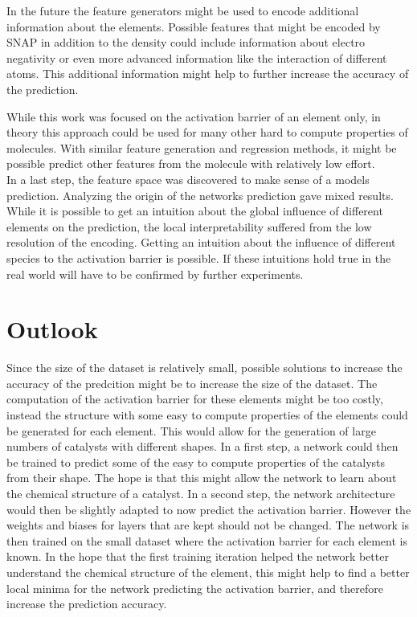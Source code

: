 In the future the feature generators might be used to encode additional information about the elements.
Possible features that might be encoded by SNAP in addition to the density could include information about 
electro negativity or even more advanced information like the interaction of different atoms.
This additional information might help to further increase the accuracy of the prediction.

While this work was focused on the activation barrier of an element only,
in theory this approach could be used for many other hard to compute properties of molecules.
With similar feature generation and regression methods, it might be possible 
predict other features from the molecule with relatively low effort.
\\

In a last step, the feature space was discovered to make sense of a models prediction.
Analyzing the origin of the networks prediction gave mixed results.
While it is possible to get an intuition about the global influence of different elements on
the prediction, the local interpretability suffered from the low resolution of the encoding.
Getting an intuition about the influence of different species to the activation barrier is possible.
If these intuitions hold true in the real world will have to be confirmed by further experiments.

\section{Outlook}

Since the size of the dataset is relatively small, possible solutions to increase the accuracy of the predcition might be to 
increase the size of the dataset.
The computation of the activation barrier for these elements might be too costly, instead the structure with some easy to compute 
properties of the elements could be generated for each element.
This would allow for the generation of large numbers of catalysts with different shapes.
In a first step, a network could then be trained to predict some of the easy to compute properties of the catalysts from their shape.
The hope is that this might allow the network to learn about the chemical structure of a catalyst.
In a second step, the network architecture would then be slightly adapted to now predict the activation barrier.
However the weights and biases for layers that are kept should not be changed.
The network is then trained on the small dataset where the activation barrier for each element is known.
In the hope that the first training iteration helped the network better understand the chemical structure of the element,
this might help to find a better local minima for the network predicting the activation barrier, and therefore increase the prediction accuracy.
\\

